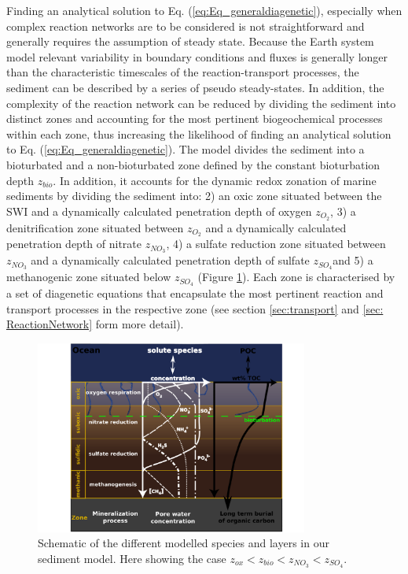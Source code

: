 \documentclass[gmd, manuscript]{copernicus}
\begin{document}
Finding an analytical solution to  Eq. (\ref{eq:Eq_generaldiagenetic}), especially when complex reaction networks are to be considered is not straightforward and generally requires the assumption of steady state. 
Because the Earth system model relevant variability in boundary conditions and fluxes is generally longer than the characteristic timescales of the reaction-transport processes, the sediment can be described by a 
series of pseudo steady-states. In addition, the complexity of the reaction network can be reduced by dividing the sediment into distinct zones and accounting for the most pertinent biogeochemical processes 
within each zone, thus increasing the likelihood of finding an analytical solution to Eq. (\ref{eq:Eq_generaldiagenetic}). The model divides the sediment into a bioturbated and a non-bioturbated zone 
defined by the constant bioturbation depth $z_{bio}$. In addition, it accounts for the dynamic redox zonation of marine sediments by dividing the sediment into: 2) an oxic zone situated between the 
SWI and a dynamically calculated penetration depth of oxygen $z_{O_2}$, 3) a denitrification zone situated between $z_{O_2}$ and a dynamically calculated penetration depth of nitrate $z_{NO_3}$, 4) 
a sulfate reduction zone situated between $z_{NO_3}$ and a dynamically calculated penetration depth of sulfate $z_{SO_4}$and 5) a methanogenic zone situated below $z_{SO_4}$ (Figure \ref{fig:Sediment_layers}). 
Each zone is characterised by a set of diagenetic equations that encapsulate the most pertinent reaction and transport processes in the respective zone (see section \ref{sec:transport} and \ref{sec: ReactionNetwork} 
form more detail). 
\begin{figure}[htbp]
\begin{center}
	\includegraphics[width=0.8\textwidth]{figures/Sediment-model-with-profiles-rotated90.pdf}
	\caption{Schematic of the different modelled species and layers in our sediment model. Here showing the case $z_{ox} < z_{bio} < z_{NO_3} < z_{SO_4}$.}
	\label{fig:Sediment_layers}
	\end{center}
\end{figure}
\end{document}
